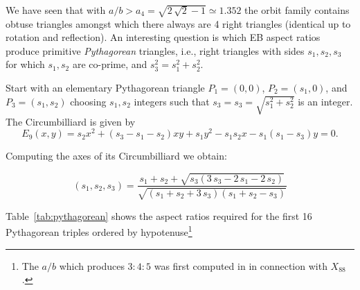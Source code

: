 We have seen \cite{ronaldo2020-loci} that with $a/b>a_4=\sqrt{2\,\sqrt{2}-1}\simeq{1.352}$ the orbit family contains obtuse triangles amongst which there always are 4 right triangles (identical up to rotation and reflection). An interesting question is which EB aspect ratios produce primitive {\em Pythagorean} triangles, i.e., right triangles with sides $s_1,s_2,s_3$ for which $s_1,s_2$ are co-prime, and $s_3^2=s_1^2+s_2^2$.

Start with an elementary Pythagorean triangle $P_1=(0,0)$, $P_2=(s_1,0)$, and $P_3=(s_1,s_2)$ choosing $s_1,s_2$ integers such that $s_3=s_3=\sqrt{s_1^2+s_2^2}$ is an integer.
The Circumbilliard is given by
\[
E_9(x,y)= s_2 x^2+ \left( s_3-s_1-s_2 \right) xy+s_1{y}^{2}-s_1s_2x-s_1 \left( s_1-s_3 \right) y=0.\]

Computing the axes of its Circumbilliard we obtain: 

\begin{equation}
    [a/b](s_1,s_2,s_3)= \frac {s_1+s_2+\sqrt {s_3\left(3\,s_3-2\,s_1-2\,s_2\right) }}{\sqrt { \left( 
s_1+s_2+3\,s_3 \right)  \left( s_1+s_2-s_3 \right) }}
\end{equation}



Table~\ref{tab:pythagorean} shows the aspect ratios required for the first 16 Pythagorean triples ordered by hypotenuse\footnote{The $a/b$ which produces $3:4:5$ was first computed in \cite{ronaldo2020-loci} in connection with $X_{88}$.}

